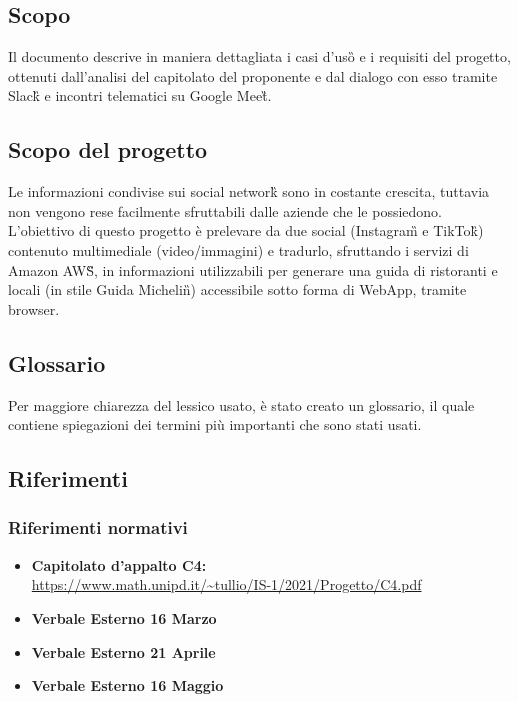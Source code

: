 \subsection{Scopo}
Il documento descrive in maniera dettagliata i casi d'uso\G{} e i requisiti del progetto, ottenuti dall'analisi del capitolato del proponente \proponente{} e dal dialogo con esso tramite Slack\G{} e incontri telematici su Google Meet\G{}.

\subsection{Scopo del progetto}
Le informazioni condivise sui social network\G{} sono in costante crescita, tuttavia non vengono rese facilmente sfruttabili dalle aziende che le possiedono. L'obiettivo di questo progetto è prelevare da due social (Instagram\G{} e TikTok\G{}) contenuto multimediale (video/immagini) e tradurlo, sfruttando i servizi di Amazon AWS\G{}, in informazioni utilizzabili per generare una guida di ristoranti e locali (in stile Guida Michelin\G{}) accessibile sotto forma di WebApp, tramite browser.

\subsection{Glossario}
Per maggiore chiarezza del lessico usato, è stato creato un glossario, il quale 
contiene spiegazioni dei termini più importanti che sono stati usati.

\subsection{Riferimenti}
\subsubsection{Riferimenti normativi}
\begin{itemize}
	\item
	{\textbf{Capitolato d'appalto C4:}}\\\url{https://www.math.unipd.it/~tullio/IS-1/2021/Progetto/C4.pdf}
    \item
    \textbf{Verbale Esterno 16 Marzo}
    \item
	\textbf{Verbale Esterno 21 Aprile}
    \item
	\textbf{Verbale Esterno 16 Maggio}

\end{itemize}
